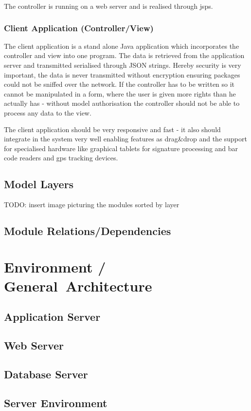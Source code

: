 \documentclass[11pt,a4paper,oneside,svgnames]{report}
\begin{document}
The controller is running on a web server and is realised through \glspl{jsp}.

\subsection{Client Application (Controller/View)}
The client application is a stand alone Java application which incorporates the controller and view into one program. The data is retrieved from the application server and transmitted serialised through JSON strings. Hereby security is very important, the data is never transmitted without encryption ensuring packages could not be sniffed over the network. If the controller has to be written so it cannot be manipulated in a form, where the user is given more rights than he actually has - without model authorisation the controller should not be able to process any data to the view.

The client application should be very responsive and fast - it also should integrate in the system very well enabling features as drag\&drop and the support for specialised hardware like graphical tablets for signature processing and bar code readers and gps tracking devices.

\section{Model Layers}
TODO: insert image picturing the modules sorted by layer

\section{Module Relations/Dependencies}


\chapter{Environment / General~Architecture}
\section{Application Server}
\section{Web Server}
\section{Database Server}
\section{Server Environment}
\end{document}
